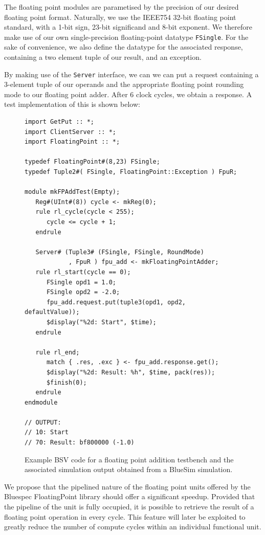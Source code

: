 \documentclass[a4paper,8pt]{report}
\begin{document}
The floating point modules are parametised by the precision of our desired floating
point format. Naturally, we use the IEEE754 32-bit floating point standard, with a 1-bit sign,
23-bit significand and 8-bit exponent. We therefore make use of our own
single-precision floating-point datatype \texttt{FSingle}. For the sake of
convenience, we also define the datatype for the associated response, containing
a two element tuple of our result, and an exception.

By making use of the \texttt{Server} interface, we can we can put a request containing a
3-element tuple of our operands and the appropriate floating point rounding mode
to our floating point adder. After 6 clock cycles, we obtain a response. A test
implementation of this is shown below: \\

\begin{figure}[h]
  \centering 
\scriptsize
\begin{verbatim}
import GetPut :: *;
import ClientServer :: *;
import FloatingPoint :: *;

typedef FloatingPoint#(8,23) FSingle;
typedef Tuple2#( FSingle, FloatingPoint::Exception ) FpuR;

module mkFPAddTest(Empty);
   Reg#(UInt#(8)) cycle <- mkReg(0);
   rule rl_cycle(cycle < 255);
      cycle <= cycle + 1;
   endrule

   Server# (Tuple3# (FSingle, FSingle, RoundMode)
            , FpuR ) fpu_add <- mkFloatingPointAdder;
   rule rl_start(cycle == 0);
      FSingle opd1 = 1.0;
      FSingle opd2 = -2.0;
      fpu_add.request.put(tuple3(opd1, opd2, defaultValue));
      $display("%2d: Start", $time);
   endrule

   rule rl_end;
      match { .res, .exc } <- fpu_add.response.get();
      $display("%2d: Result: %h", $time, pack(res)); 
      $finish(0);
   endrule
endmodule

// OUTPUT:
// 10: Start
// 70: Result: bf800000 (-1.0)
\end{verbatim}
\normalsize
\caption{Example BSV code for a floating point addition testbench and the
  associated simulation output obtained from a BlueSim simulation.}
\end{figure}

We propose that the pipelined nature of the floating point units offered by the
Bluespec FloatingPoint library should offer a significant speedup. Provided that
the pipeline of the unit is fully occupied, it is possible to retrieve the result
of a floating point operation in every cycle. This feature will later be
exploited to greatly reduce the number of compute cycles within an individual
functional unit.
\end{document}

